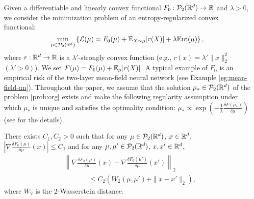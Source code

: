 Given a differentiable and linearly convex functional $F_0 :\mathcal{P}_2(\mathbb{R}^d) \to \mathbb{R}$ and $\lambda>0$, we consider the minimization problem of an entropy-regularized convex functional: %
\begin{equation}\label{prob:org}
    \min_{\mu \in \mathcal{P}_2(\mathbb{R}^d)} 
    \left\{ 
    \mathcal{L}(\mu) = F_0(\mu) + \mathbb{E}_{X \sim \mu}[ r(X)] + \lambda \mathrm{Ent}(\mu)
    \right\},
\end{equation}
where $r: \mathbb{R}^d \to \mathbb{R}$ is a $\lambda'$-strongly convex function (e.g., $r(x) = \lambda' \|x\|_2^2$ $(\lambda'>0)$).
We set $F(\mu) = F_0(\mu) + \mathbb{E}_{\mu}[r(X)]$. 
A typical example of $F_0$ is an empirical risk of the two-layer mean-field neural network (see Example \ref{eg:mean-field-nn}).
Throughout the paper, we assume that the solution $\mu_* \in \mathcal{P}_2(\mathbb{R}^d)$ of the problem \eqref{prob:org} exists and make the following regularity assumption \cite{chizat2022mean,nitanda2022convex,chen2023entropic} under which $\mu_*$ is unique and satisfies the optimality condition: $\mu_* \propto \exp\left( -\frac{1}{\lambda} \frac{\delta F(\mu_*)}{\delta \mu}\right)$ (see \citet{hu2019mean,chizat2022mean} for the details).
\begin{assumption}\label{assumption:wg_regularity}
    There exists $C_1, C_2>0$ such that for any $\mu \in \mathcal{P}_2(\mathbb{R}^d)$, $x \in \mathbb{R}^d$, $\left| \nabla \frac{\delta F_0(\mu)}{\delta \mu}(x) \right| \leq C_1$ and for any $\mu, \mu' \in \mathcal{P}_2(\mathbb{R}^d)$, $x, x' \in \mathbb{R}^d$,    
    \begin{align*}
        &\left\| \nabla \frac{\delta F_0(\mu)}{\delta \mu}(x) - \nabla \frac{\delta F_0(\mu')}{\delta \mu}(x') \right\|_2 \\
        &~~~~~~~~~~~~~~~~\leq C_2 \left( W_2(\mu,\mu') + \| x - x'\|_2 \right),
    \end{align*}
    where $W_2$ is the $2$-Wasserstein distance.
\end{assumption}


